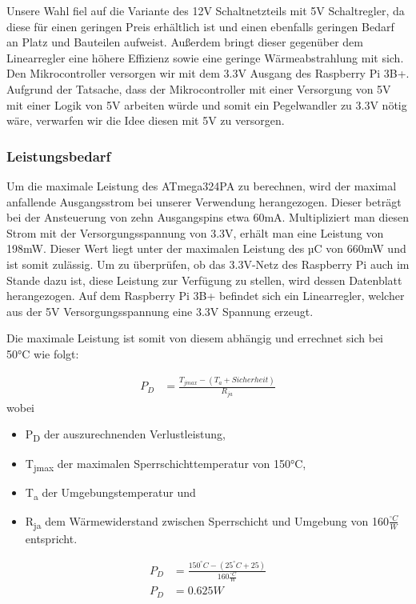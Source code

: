Unsere Wahl fiel auf die Variante des 12V Schaltnetzteils mit 5V Schaltregler, da diese für einen geringen Preis erhältlich ist
und einen ebenfalls geringen Bedarf an Platz und Bauteilen aufweist.
Außerdem bringt dieser gegenüber dem Linearregler eine höhere Effizienz sowie eine geringe Wärmeabstrahlung mit sich.
Den Mikrocontroller versorgen wir mit dem 3.3V Ausgang des Raspberry Pi 3B+.
Aufgrund der Tatsache, dass der Mikrocontroller mit einer Versorgung von 5V mit einer Logik von 5V arbeiten würde und somit ein Pegelwandler zu 3.3V nötig wäre, verwarfen wir die Idee diesen mit 5V zu versorgen.

\subsubsection{Leistungsbedarf}

Um die maximale Leistung des ATmega324PA zu berechnen, wird der maximal anfallende Ausgangsstrom bei unserer Verwendung herangezogen.
Dieser beträgt bei der Ansteuerung von zehn Ausgangspins etwa 60mA.
Multipliziert man diesen Strom mit der Versorgungsspannung von 3.3V, erhält man eine Leistung von 198mW.
Dieser Wert liegt unter der maximalen Leistung des µC von 660mW und ist somit zulässig.
\newpage
{}Um zu überprüfen, ob das 3.3V-Netz des Raspberry Pi auch im Stande dazu ist, diese Leistung zur Verfügung zu stellen, wird dessen Datenblatt herangezogen.
Auf dem Raspberry Pi 3B+ befindet sich ein Linearregler, welcher aus der 5V Versorgungsspannung eine 3.3V Spannung erzeugt.

Die maximale Leistung ist somit von diesem abhängig und errechnet sich bei 50°C wie folgt:

\begin{align*}
    P_D &= \frac{T_{jmax} - (T_a + Sicherheit)}{R_{ja}}
\end{align*}
wobei
\begin{itemize}
    \item P\textsubscript{D} der auszurechnenden Verlustleistung,
    \item T\textsubscript{jmax} der maximalen Sperrschichttemperatur von 150°C,
    \item T\textsubscript{a} der Umgebungstemperatur und
    \item R\textsubscript{ja} dem Wärmewiderstand zwischen Sperrschicht und Umgebung von 160$\frac{^\circ C}{W}$ entspricht.
\end{itemize}

\begin{align*}
    P_D &= \frac{150^{\circ}C - (25^{\circ}C + 25)}{160 \frac{{}^{\circ}C}{W}} \\
    P_D &= 0.625W
\end{align*}

